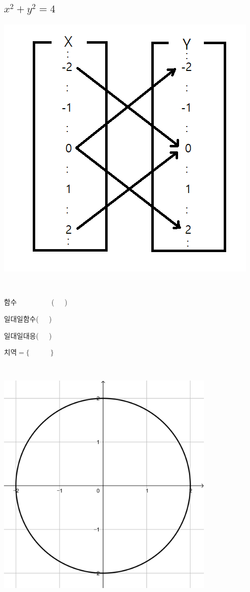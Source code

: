 \documentclass[a4paper]{oblivoir}
\begin{document}
\subsection{\(x^2+y^2=4\)}
%
\begin{minipage}{0.4\textwidth}
\includegraphics[width=\textwidth]{x^2+y^2=4}
\end{minipage}
~
\begin{minipage}{0.20\textwidth}
함수~~~~~~~~~~(~~~)\par\bigskip
일대일함수(~~~)\par\bigskip
일대일대응(~~~)\par\bigskip
치역\(=\{\qquad\quad\}\)
\end{minipage}
~
\begin{minipage}{0.35\textwidth}
\includegraphics[width=0.8\textwidth]{x^2+y^2=4-}
\end{minipage}
\end{document}
